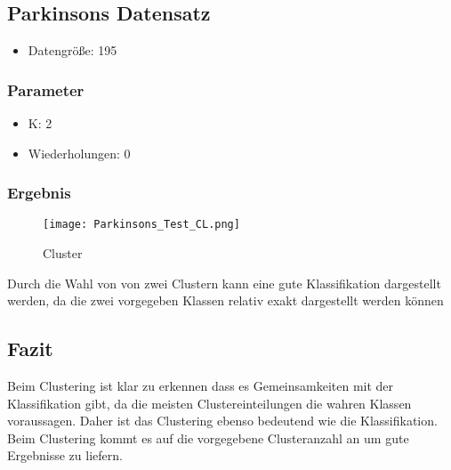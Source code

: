 \subsection{Parkinsons Datensatz}
\begin{itemize}
	\item Datengröße: 195
\end{itemize}
\subsubsection{Parameter}
\begin{itemize}
	\item K: 2 
	\item Wiederholungen: 0
\end{itemize}
\subsubsection{Ergebnis}
\begin{figure}[H]
\texttt{[image: Parkinsons\_Test\_CL.png]}
\caption{Cluster}
\end{figure}
Durch die Wahl von von zwei Clustern kann eine gute Klassifikation dargestellt werden, da die zwei vorgegeben Klassen relativ exakt dargestellt werden können 

\cite{uci}
\subsection{Fazit} 
Beim Clustering ist klar zu erkennen dass es Gemeinsamkeiten mit der Klassifikation gibt, da die meisten Clustereinteilungen die wahren Klassen voraussagen. Daher ist das Clustering ebenso bedeutend wie die Klassifikation. Beim Clustering kommt es auf die  vorgegebene Clusteranzahl an um gute Ergebnisse zu liefern.